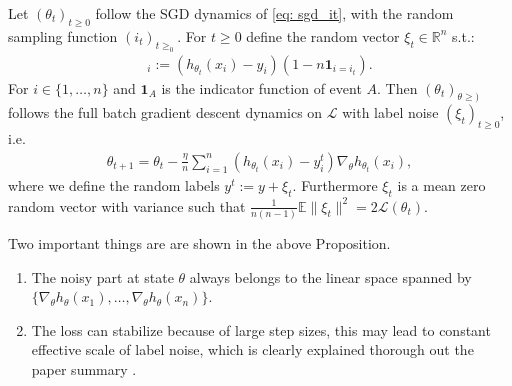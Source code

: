 \begin{proposition}
    Let $(\theta_t)_{t\ge 0 }$ follow the SGD dynamics of \ref{eq: sgd_it},
    with the random sampling function $(i_t)_{t\ge_0}$. For $t\ge 0$ define
    the random vector $\xi_t \in \mathbb{R}^{n}$ s.t.:
    \begin{align}
        [\xi_t]_i := (h_{\theta_t}(x_i) - y_i)(1-n\mathbf{1}_{i=i_t}).
    \end{align}
    For $i \in \{1,\ldots,n\}$ and $\mathbf{1}_{A}$ is the indicator function
    of event $A$. Then $(\theta_t)_{\theta\ge )}$ follows the full batch
    gradient descent dynamics on $\mathcal{L}$ with label noise
    $(\xi_t)_{t\ge 0}$, i.e.
    \begin{align}
        \theta_{t+1} = \theta_t - \frac{\eta}{n} \sum_{i=1}^{n}
        \left( h_{\theta_t}(x_i) - y_i^{t} \right)
        \nabla_{\theta}h_{\theta_t}(x_i),
    \end{align}
    where we define the random labels $y^{t} := y + \xi_t$. Furthermore
    $\xi_t$ is a mean zero random vector with variance such that
    $\frac{1}{n(n-1)}\mathbb{E}\|\xi_t\|^{2} = 2 \mathcal{L}(\theta_t)$.
\end{proposition}
Two important things are are shown in the above Proposition.
\begin{enumerate}
    \item The noisy part at state $\theta$ always belongs to the linear space
        spanned by $\{\nabla_\theta h_\theta(x_1),\ldots, \nabla_\theta
        h_\theta(x_n)\}$.

    \item The loss can stabilize because of large step sizes, this may lead
        to constant effective scale of label noise, which is clearly
        explained thorough out the paper summary \cite{andriushchenko2023sgd}.
\end{enumerate}
